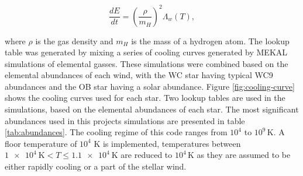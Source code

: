 \begin{equation}
  \frac{dE}{dt} = \left(\frac{\rho}{m_H}\right)^2 \Lambda_w(T),
\end{equation}

\noindent
where $\rho$ is the gas density and $m_H$ is the mass of a hydrogen atom.
The lookup table was generated by mixing a series of cooling curves generated by MEKAL simulations of elemental gasses.
These simulations were combined based on the elemental abundances of each wind, with the WC star having typical WC9 abundances and the OB star having a solar abundance.
%
%
Figure \ref{fig:cooling-curve} shows the cooling curves used for each star.
Two lookup tables are used in the simulations, based on the elemental abundances of each star. 
The most significant abundances used in this projects simulations are presented in table \ref{tab:abundances}.
The cooling regime of this code ranges from $10^4$ to $10^9\,\si{\kelvin}$.
A floor temperature of $10^4$ \si{\kelvin} is implemented, temperatures between $\SI{1e4}{\kelvin} < T \leq \SI{1.1e4}{\kelvin}$ are reduced to $10^4\,\si{\kelvin}$ as they are assumed to be either rapidly cooling or a part of the stellar wind.

